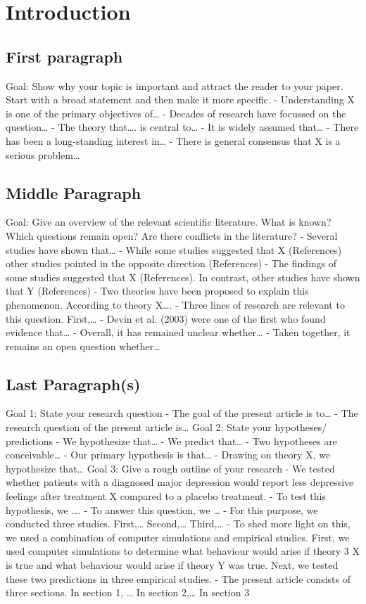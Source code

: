 \chapter{Introduction}

\section{First paragraph}
\label{first-paragraph}

Goal: Show why your topic is important and attract the reader to your paper. Start
with a broad statement and then make it more specific.
- Understanding X is one of the primary objectives of…
- Decades of research have focussed on the question…
- The theory that…. is central to…
- It is widely assumed that…
- There has been a long-standing interest in…
- There is general consensus that X is a serious problem…

\section{Middle Paragraph}
\label{middle-paragraph}

Goal: Give an overview of the relevant scientific literature.
What is known? Which questions remain open? Are there conflicts in the literature?
- Several studies have shown that…
- While some studies suggested that X (References) other studies pointed in the opposite
direction (References)
- The findings of some studies suggested that X (References). In contrast, other studies have shown that Y (References)
- Two theories have been proposed to explain this phenomenon. According to theory X….
- Three lines of research are relevant to this question. First,…
- Devin et al. (2003) were one of the first who found evidence that…
- Overall, it has remained unclear whether…
- Taken together, it remains an open question whether…

\section{Last Paragraph(s)}
\label{last-paragraphs}

Goal 1: State your research question
- The goal of the present article is to…
- The research question of the present article is…
Goal 2: State your hypotheses/ predictions
- We hypothesize that…
- We predict that…
- Two hypotheses are conceivable…
- Our primary hypothesis is that…
- Drawing on theory X, we hypothesize that…
Goal 3: Give a rough outline of your research
- We tested whether patients with a diagnosed major depression would report less depressive
feelings after treatment X compared to a placebo treatment.
- To test this hypothesis, we ….
- To answer this question, we …
- For this purpose, we conducted three studies. First,… Second,… Third,…
- To shed more light on this, we used a combination of computer simulations and empirical
studies. First, we used computer simulations to determine what behaviour would arise if theory
3
X is true and what behaviour would arise if theory Y was true. Next, we tested these two
predictions in three empirical studies.
- The present article consists of three sections. In section 1, … In section 2,… In section 3

